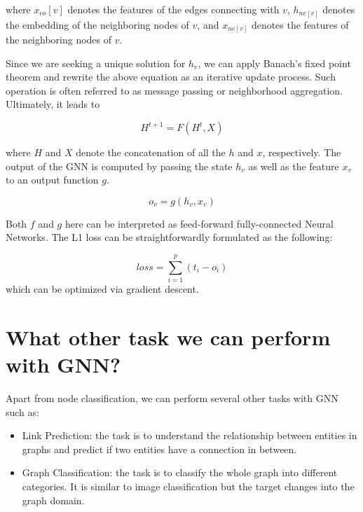 \documentclass[
]{article}
\begin{document}
where \(x_{co}[v]\) denotes the features of the edges connecting with
\(v\), \(h_{ne[v]}\) denotes the embedding of the neighboring nodes of
\(v\), and \(x_{ne[v]}\) denotes the features of the neighboring nodes
of \(v\).

Since we are seeking a unique solution for \(h_v\), we can apply
Banach's fixed point theorem and rewrite the above equation as an
iterative update process. Such operation is often referred to as message
passing or neighborhood aggregation. Ultimately, it leads to

\begin{equation}
H^{t+1} = F(H^t, X)
\end{equation}

where \(H\) and \(X\) denote the concatenation of all the \(h\) and
\(x\), respectively. The output of the GNN is computed by passing the
state \(h_v\) as well as the feature \(x_v\) to an output function
\(g\).

\begin{equation}
o_v = g(h_v, x_v)
\end{equation}

Both \(f\) and \(g\) here can be interpreted as feed-forward
fully-connected Neural Networks. The L1 loss can be straightforwardly
formulated as the following:

\begin{equation}
loss = \sum_{i=1}^p (t_i - o_i)
\end{equation} which can be optimized via gradient descent.

\hypertarget{what-other-task-we-can-perform-with-gnn}{%
\section{What other task we can perform with
GNN?}\label{what-other-task-we-can-perform-with-gnn}}

Apart from node classification, we can perform several other tasks with
GNN such as:

\begin{itemize}
\item
  Link Prediction: the task is to understand the relationship between
  entities in graphs and predict if two entities have a connection in
  between.
\item
  Graph Classification: the task is to classify the whole graph into
  different categories. It is similar to image classification but the
  target changes into the graph domain.
\end{itemize}
\end{document}
